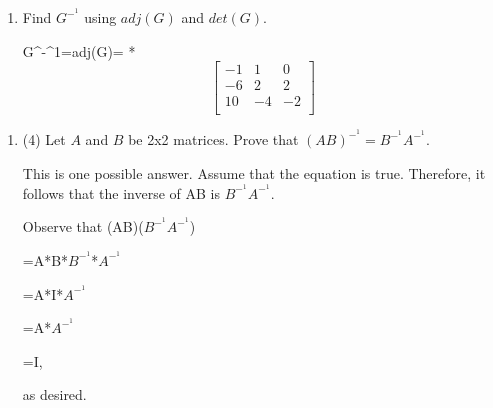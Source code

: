 \documentclass[12pt]{amsart}
\newcommand{\red}[1]{{\color{red} #1}}
\newcounter{probnum}
\newenvironment{prob}{\begin{enumerate}\setcounter{enumi}{\value{probnum}}}%
 {\setcounter{probnum}{\value{enumi}}\end{enumerate}}
\newenvironment{subprob}{\begin{enumerate}\topsep 0pt}{\end{enumerate}}
\begin{document}
\begin{prob}
\begin{subprob}
\red{Therefore, adj(G)=
$$
\left[ 
\begin{array}{ccc}
(1)(-1) & (-1)(6) & (1)(10) \\
(-1)(-1) & (1)(2) & (-1)(4) \\
(1)(0) & (-1)(-2) & (1)(-2) \\
\end{array} \right]^T=\left[ 
\begin{array}{ccc}
-1 & -6 & 10 \\
1 & 2 & -4 \\
0 & 2 & -2 \\
\end{array} \right]^T=\left[ 
\begin{array}{ccc}
-1 & 1 & 0 \\
-6 & 2 & 2 \\
10 & -4 & -2 \\
\end{array} \right]
$$}

\red{Also, det(G)=(1)[(4)(3)-(2)(1)]+(-1)[(2)(3)-(2)(1)]+(2)[(2)(1)-(4)(1)]

=10-4-4=2}

\item{}Find $G^-^1$ using $adj(G)$ and $det(G)$.

\red{G^-^1=adj(G)=
*$$
\left[ 
\begin{array}{ccc}
-1 & 1 & 0 \\
-6 & 2 & 2 \\
10 & -4 & -2 \\
\end{array} \right]
$$}

\end{subprob}
\end{prob}
\bigskip
\begin{prob} 
\item[(4)] Let $A$ and $B$ be 2x2 matrices. Prove that $(AB)^-^1=B^-^1A^-^1$.  

\red{This is one possible answer. Assume that the equation is true. Therefore, it follows that the inverse of AB is $B^-^1A^-^1$}.

\red{Observe that (AB)($B^-^1A^-^1$)

=A*B*$B^-^1$*$A^-^1$

=A*I*$A^-^1$

=A*$A^-^1$

=I,}

\red{as desired.}

\end{prob}
 
\end{document}
